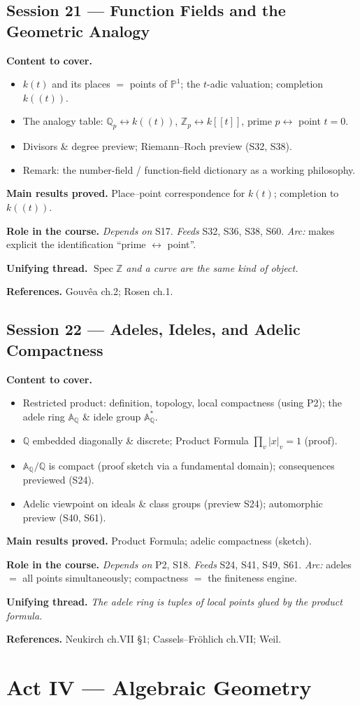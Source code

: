 \documentclass[11pt,a4paper]{article}
\newcommand{\sess}[2]{\subsection[#1. #2]{Session #1 --- #2}}
\newcommand{\chead}{\par\smallskip\noindent\textbf{Content to cover.}}
\newcommand{\proved}[1]{\par\smallskip\noindent\textbf{Main results proved.} #1}
\newcommand{\role}[1]{\par\smallskip\noindent\textbf{Role in the course.} #1}
\newcommand{\thread}[1]{\par\smallskip\noindent\textbf{Unifying thread.} \textit{#1}}
\newcommand{\srefs}[1]{\par\smallskip\noindent\textbf{References.} #1}
\newcommand{\Z}{\mathbb{Z}}
\newcommand{\Q}{\mathbb{Q}}
\newcommand{\A}{\mathbb{A}}
\newcommand{\PP}{\mathbb{P}}
\newcommand{\Spec}{\operatorname{Spec}}
\begin{document}
	\sess{21}{Function Fields and the Geometric Analogy}
	\chead
	\begin{itemize}
		\item $k(t)$ and its places $=$ points of $\PP^1$; the $t$-adic valuation; completion $k((t))$.
		\item The analogy table: $\Q_p\leftrightarrow k((t))$, $\Z_p\leftrightarrow k[[t]]$, prime $p\leftrightarrow$ point $t=0$.
		\item Divisors \& degree preview; Riemann--Roch preview (S32, S38).
		\item Remark: the number-field / function-field dictionary as a working philosophy.
	\end{itemize}
	\proved{Place--point correspondence for $k(t)$; completion to $k((t))$.}
	\role{\emph{Depends on} S17. \emph{Feeds} S32, S36, S38, S60. \emph{Arc:} makes explicit the identification ``prime $\leftrightarrow$ point''.}
	\thread{$\Spec\Z$ and a curve are the same kind of object.}
	\srefs{Gouv\^ea ch.2; Rosen ch.1.}
	
	\sess{22}{Adeles, Ideles, and Adelic Compactness}
	\chead
	\begin{itemize}
		\item Restricted product: definition, topology, local compactness (using P2); the adele ring $\A_\Q$ \& idele group $\A_\Q^*$.
		\item $\Q$ embedded diagonally \& discrete; Product Formula $\prod_v|x|_v=1$ (proof).
		\item $\A_\Q/\Q$ is compact (proof sketch via a fundamental domain); consequences previewed (S24).
		\item Adelic viewpoint on ideals \& class groups (preview S24); automorphic preview (S40, S61).
	\end{itemize}
	\proved{Product Formula; adelic compactness (sketch).}
	\role{\emph{Depends on} P2, S18. \emph{Feeds} S24, S41, S49, S61. \emph{Arc:} adeles $=$ all points simultaneously; compactness $=$ the finiteness engine.}
	\thread{The adele ring is tuples of local points glued by the product formula.}
	\srefs{Neukirch ch.VII \S1; Cassels--Fr\"ohlich ch.VII; Weil.}
	
	\section{Act IV --- Algebraic Geometry}
	
\end{document}
